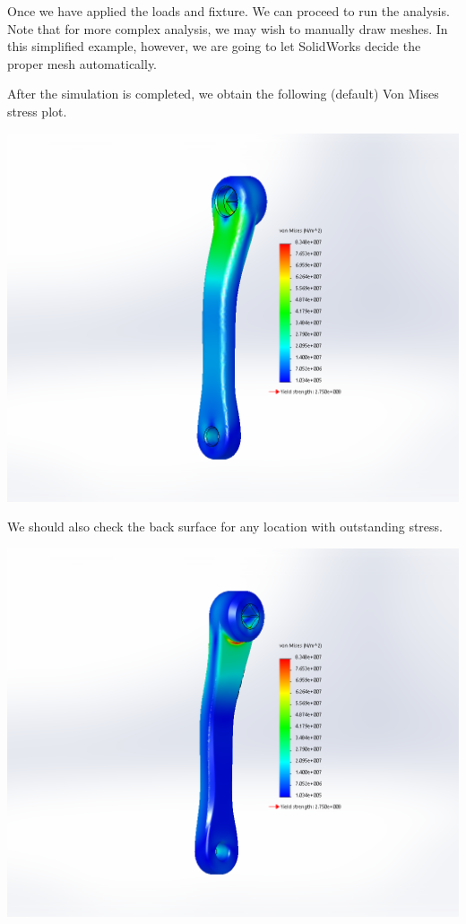 \documentclass[a4paper,openany,nobib]{tufte-book}
\begin{document}
{{Once we have applied the loads and fixture. We can proceed to run the
analysis. Note that for more complex analysis, we may wish to manually
draw meshes. In this simplified example, however, we are going to let
SolidWorks decide the proper mesh automatically.

After the simulation is completed, we obtain the following (default) Von
Mises stress plot.


\begin{center}
\includegraphics[width=.9\linewidth]{pictures/Intro-CAD/Crank-result-front.png}
\end{center}

We should also check the back surface for any location with outstanding
stress.


\begin{center}
\includegraphics[width=.9\linewidth]{pictures/Intro-CAD/Crank-result-back.png}
\end{center}

}}
\end{document}
